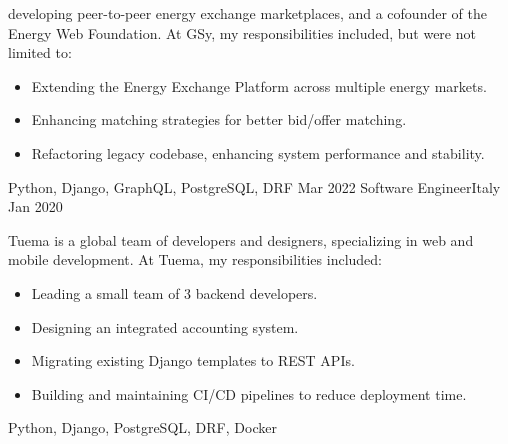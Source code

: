 \begin{experiences}
{    developing peer-to-peer energy exchange marketplaces, and a cofounder
    of the Energy Web Foundation. At GSy, my responsibilities included,
    but were not limited to:
    \begin{itemize}
      \item Extending the Energy Exchange Platform across multiple energy markets.
      \item Enhancing matching strategies for better bid/offer matching.
      \item Refactoring legacy codebase, enhancing system performance and stability.
    \end{itemize}
  }
  {Python, Django, GraphQL, PostgreSQL, DRF}
  \emptySeparator
  \experience
  {Mar 2022} {Software Engineer}{}{Italy}
  {Jan 2020} {
    Tuema is a global team of developers and designers, specializing in web and mobile development.
    At Tuema, my responsibilities included:
    \begin{itemize}
      \item Leading a small team of 3 backend developers.
      \item Designing an integrated accounting system.
      \item Migrating existing Django templates to REST APIs.
      \item Building and maintaining CI/CD pipelines to reduce deployment time.
    \end{itemize}
  }
  {Python, Django, PostgreSQL, DRF, Docker}
  \emptySeparator
\end{experiences}
